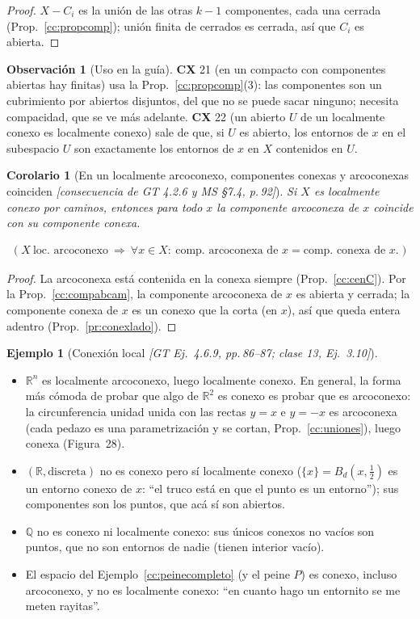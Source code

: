\documentclass[11pt,a4paper]{article}
\newenvironment{lista}{\leavevmode\begin{itemize}[leftmargin=1.5em,itemsep=1pt,topsep=2pt,parsep=0pt]}{\end{itemize}}
\newcommand{\lgc}[1]{\par\vspace{-3pt}\begin{gather*}\big(\;#1\;\big)\end{gather*}\vspace{-6pt}}
\theoremstyle{definition}
\newtheorem{ejemplo}[definicion]{Ejemplo}
\newtheorem{observacion}[definicion]{Observación}
\theoremstyle{plain}
\newtheorem{corolario}[definicion]{Corolario}
\newcommand{\fnt}[1]{{\normalfont\small\itshape\color{gray!150!black}[#1]}}
\newcommand{\R}{\mathbb{R}}
\newcommand{\Q}{\mathbb{Q}}
\newcommand{\Bola}[2]{B_d(#1,#2)}
\begin{document}
\begin{proof}
$X-C_i$ es la unión de las otras $k-1$ componentes, cada una cerrada (Prop.~\ref{cc:propcomp}); unión finita de cerrados es cerrada, así que $C_i$ es abierta.
\end{proof}

\begin{observacion}[Uso en la guía]
\textbf{CX} 21 (en un compacto con componentes abiertas hay finitas) usa la Prop.~\ref{cc:propcomp}(3): las componentes son un cubrimiento por abiertos disjuntos, del que no se puede sacar ninguno; necesita compacidad, que se ve más adelante. \textbf{CX} 22 (un abierto $U$ de un localmente conexo es localmente conexo) sale de que, si $U$ es abierto, los entornos de $x$ en el subespacio $U$ son exactamente los entornos de $x$ en $X$ contenidos en $U$.
\end{observacion}

\begin{corolario}[En un localmente arcoconexo, componentes conexas y arcoconexas coinciden \fnt{consecuencia de GT 4.2.6 y MS \S7.4, p.\,92}]\label{cc:igualcomp}
Si $X$ es localmente conexo por caminos, entonces para todo $x$ la componente arcoconexa de $x$ coincide con su componente conexa.
\lgc{X\ \text{loc.\ arcoconexo}\ \Rightarrow\ \forall x\in X:\ \text{comp.\ arcoconexa de } x=\text{comp.\ conexa de } x.}
\end{corolario}

\begin{proof}
La arcoconexa está contenida en la conexa siempre (Prop.~\ref{cc:cenC}). Por la Prop.~\ref{cc:compabcam}, la componente arcoconexa de $x$ es abierta y cerrada; la componente conexa de $x$ es un conexo que la corta (en $x$), así que queda entera adentro (Prop.~\ref{pr:conexlado}).
\end{proof}

\begin{ejemplo}[Conexión local \fnt{GT Ej.\ 4.6.9, pp.\,86--87; clase 13, Ej.\ 3.10}]\label{cc:ejlocconex}
\begin{lista}
\item $\R^n$ es localmente arcoconexo, luego localmente conexo. En general, la forma más cómoda de probar que algo de $\R^2$ es conexo es probar que es arcoconexo: la circunferencia unidad unida con las rectas $y=x$ e $y=-x$ es arcoconexa (cada pedazo es una parametrización y se cortan, Prop.~\ref{cc:uniones}), luego conexa (Figura~28).
\item $(\R,\text{discreta})$ no es conexo pero sí localmente conexo ($\{x\}=\Bola{x}{\frac12}$ es un entorno conexo de $x$: ``el truco está en que el punto es un entorno''); sus componentes son los puntos, que acá sí son abiertos.
\item $\Q$ no es conexo ni localmente conexo: sus únicos conexos no vacíos son puntos, que no son entornos de nadie (tienen interior vacío).
\item El espacio del Ejemplo~\ref{cc:peinecompleto} (y el peine $P$) es conexo, incluso arcoconexo, y no es localmente conexo: ``en cuanto hago un entornito se me meten rayitas''.
\end{lista}
\end{ejemplo}
\end{document}
